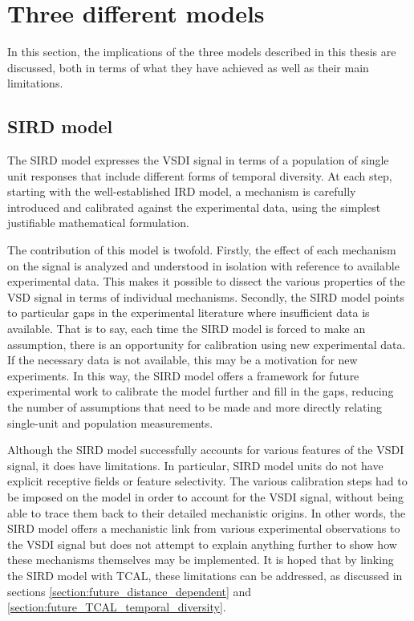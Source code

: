 \documentclass[phd,ianc,twoside]{infthesis}
\begin{document}
\section{Three different models}

In this section, the implications of the three models described in this
thesis are discussed, both in terms of what they have achieved as well
as their main limitations.

\subsection{SIRD model}

The SIRD model expresses the VSDI signal in terms of a population of
single unit responses that include different forms of temporal
diversity. At each step, starting with the well-established IRD model, a mechanism is
carefully introduced and calibrated against the experimental data, using
the simplest justifiable mathematical formulation.

The contribution of this model is twofold. Firstly, the effect of each
mechanism on the signal is analyzed and understood in isolation with
reference to available experimental data. This makes it possible to
dissect the various properties of the VSD signal in terms of individual
mechanisms. Secondly, the SIRD model points to particular gaps in the
experimental literature where insufficient data is available. That is to
say, each time the SIRD model is forced to make an assumption, there is
an opportunity for calibration using new experimental data. If the
necessary data is not available, this may be a motivation for new experiments. In
this way, the SIRD model offers a framework for future experimental work
to calibrate the model further and fill in the gaps, reducing the number
of assumptions that need to be made and more directly relating
single-unit and population measurements.

Although the SIRD model successfully accounts for various features of
the VSDI signal, it does have limitations. In particular, SIRD model units do not have
explicit receptive fields or feature selectivity. The various
calibration steps had to be imposed on the model in order to account for the
VSDI signal, without being able to trace them back to their detailed
mechanistic origins. In other words, the SIRD model offers 
a mechanistic link from various experimental observations to the VSDI
signal but does not attempt to explain anything further to show how
these mechanisms themselves may be implemented. It is hoped
that by linking the SIRD model with TCAL, these limitations can be
addressed, as discussed in sections
\ref{section:future_distance_dependent} and
\ref{section:future_TCAL_temporal_diversity}.
\end{document}
